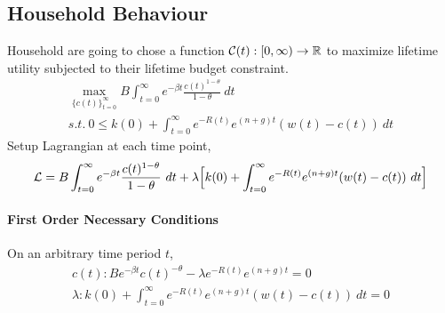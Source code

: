 \documentclass[11pt]{article}
\begin{document}
		\subsection{Household Behaviour}
			\par Household are going to chose a function $\mathcal{{C}}(t): [0, \infty) \to \mathbb{R}$ to maximize lifetime utility subjected to their lifetime budget constraint.
			\begin{gather*}
				\max_{\{c(t)\}_{t=0}^\infty} B \int_{t=0}^\infty e^{-\beta t} \frac{c(t)^{1-\theta}}{1-\theta}\ dt \\
				s.t.\ 0 \leq k(0) + \int_{t=0}^\infty {e^{-R(t)} e^{(n+g)t} (w(t) - c(t))\ dt}
			\end{gather*}
			Setup Lagrangian at each time point,
			\begin{equation}
				\mathcal{{L}} = B \int_{t=0}^\infty e^{-\beta t} \frac{c(t)^{1-\theta}}{1-\theta}\ dt + \lambda \Big [ k(0) + \int_{t=0}^\infty {e^{-R(t)} e^{(n+g)t} (w(t) - c(t))\ dt} \Big ]
			\end{equation}
			\paragraph{First Order Necessary Conditions}
				On an arbitrary time period $t$,
				\begin{gather}
					c(t): B e^{-\beta t} c(t) ^{-\theta} - \lambda e^{-R(t)} e^{(n+g)t} = 0 \\
					\lambda: k(0) + \int_{t=0}^\infty {e^{-R(t)} e^{(n+g)t} (w(t) - c(t))\ dt} = 0
				\end{gather}
\end{document}
